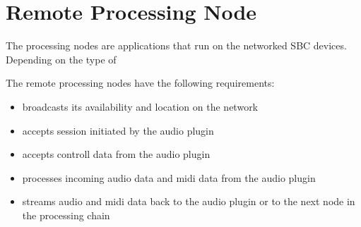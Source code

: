\section{Remote Processing Node}

The processing nodes are applications that run on the networked SBC devices. Depending on the type of

The remote processing nodes have the following requirements:
\begin{itemize}

\item broadcasts its availability and location on the network
\item accepts session initiated by the audio plugin
\item accepts controll data from the audio plugin
\item processes incoming audio data and midi data from the audio plugin
\item streams audio and midi data back to the audio plugin or to the next node in the processing chain

\end{itemize}
